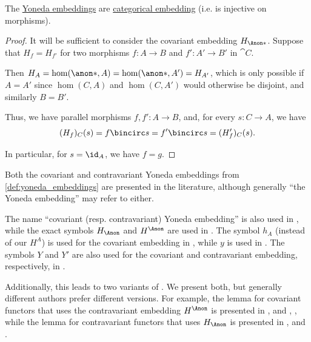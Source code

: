 \begin{proposition}\label{thm:yoneda_embeddings_are_embeddings}
  The \hyperref[def:yoneda_embeddings]{Yoneda embeddings} are \hyperref[def:functor_invertibility/injective]{categorical embedding} (i.e. is injective on morphisms).
\end{proposition}
\begin{proof}
  It will be sufficient to consider the covariant embedding \( H_{\Anon*} \). Suppose that \( H_f = H_{f'} \) for two morphisms \( f: A \to B \) and \( f': A' \to B' \) in \( \cat{C} \).

  Then \( H_A = \hom(\anon*, A) = \hom(\anon*, A') = H_{A'} \), which is only possible if \( A = A' \) since \( \hom(C, A) \) and \( \hom(C, A') \) would otherwise be disjoint, and similarly \( B = B' \).

  Thus, we have parallel morphisms \( f, f': A \to B \), and, for every \( s: C \to A \), we have
  \begin{equation*}
    (H_f)_C(s)
    =
    f \bincirc s
    =
    f' \bincirc s
    =
    (H_f')_C(s).
  \end{equation*}

  In particular, for \( s = \id_A \), we have \( f = g \).
\end{proof}

\begin{remark}\label{rem:yoneda_embedding_variance}
  Both the covariant and contravariant Yoneda embeddings from \cref{def:yoneda_embeddings} are presented in the literature, although generally \enquote{the Yoneda embedding} may refer to either.

  The name \enquote{covariant (resp. contravariant) Yoneda embedding} is also used in \cite[thm. 2.2.4]{Riehl2016CategoryTheory}, while the exact symbols \( H_{\Anon} \) and \( H^{\Anon} \) are used in \cite[def. 4.1.15; def. 4.1.21]{Leinster2014BasicCategoryTheory}. The symbol \( h_A \) (instead of our \( H^A \)) is used for the covariant embedding in \cite[695]{Eisenbud1995CommutativeAlgebra}, while \( y \) is used in \cite[def. 8.1]{Awodey2010CategoryTheory}. The symbols \( Y \) and \( Y' \) are also used for the covariant and contravariant embedding, respectively, in \cite[61]{MacLane1998CategoryTheory}.

  Additionally, this leads to two variants of . We present both, but generally different authors prefer different versions. For example, the lemma for covariant functors that uses the contravariant embedding \( H^{\Anon} \) is presented in
  \cite[61]{MacLane1998CategoryTheory},
  \cite[lemma 4.2.1]{Schubert1972Categories} and
  \cite[thm. 2.2.4]{Riehl2016CategoryTheory},
  \cite[lemma A5.1]{Eisenbud1995CommutativeAlgebra},
  while the lemma for contravariant functors that uses \( H_{\Anon} \) is presented in
  \cite[lemma 8.2]{Awodey2010CategoryTheory},
  \cite[lemma 2.2.1]{Perrone2024StartingCategoryTheory} and
  \cite[thm. 4.2.1]{Leinster2014BasicCategoryTheory}.
\end{remark}

